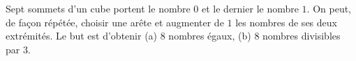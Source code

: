 Sept sommets d'un cube portent le nombre $0$ et le dernier le nombre $1$. On peut, de façon répétée, choisir une arête et augmenter de $1$ les nombres de ses deux extrémités. Le but est d'obtenir (a) $8$ nombres égaux, (b) $8$ nombres divisibles par $3$.
